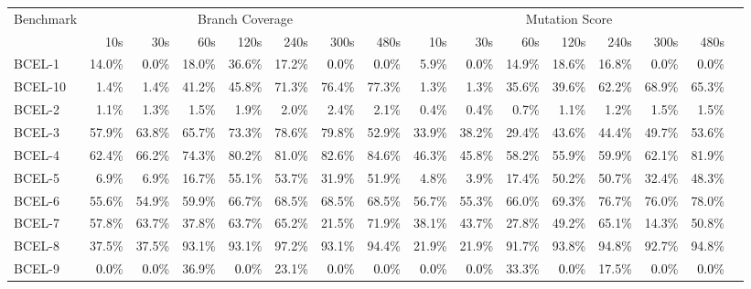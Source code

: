 \begin{tabular}{ l rrrrrrr rrrrrrrr}\toprule 
 Benchmark &  \multicolumn{7}{c}{Branch Coverage} &  \multicolumn{7}{c}{Mutation Score}\\ 
 & 10s & 30s & 60s & 120s & 240s & 300s & 480s & 10s & 30s & 60s & 120s & 240s & 300s & 480s \\ 
\midrule 
BCEL-1 & 14.0\% & \cellcolor{light-gray} \textcolor{black}{0.0}\% & 18.0\% & 36.6\% & 17.2\% & \cellcolor{light-gray} \textcolor{black}{0.0}\% & \cellcolor{light-gray} \textcolor{black}{0.0}\% & 5.9\% & \cellcolor{light-gray} \textcolor{black}{0.0}\% & 14.9\% & 18.6\% & 16.8\% & \cellcolor{light-gray} \textcolor{black}{0.0}\% & \cellcolor{light-gray} \textcolor{black}{0.0}\%\\ 
BCEL-10 & 1.4\% & 1.4\% & 41.2\% & 45.8\% & 71.3\% & 76.4\% & 77.3\% & 1.3\% & 1.3\% & 35.6\% & 39.6\% & 62.2\% & 68.9\% & 65.3\%\\ 
BCEL-2 & 1.1\% & 1.3\% & 1.5\% & 1.9\% & 2.0\% & 2.4\% & 2.1\% & 0.4\% & 0.4\% & 0.7\% & 1.1\% & 1.2\% & 1.5\% & 1.5\%\\ 
BCEL-3 & 57.9\% & 63.8\% & 65.7\% & 73.3\% & 78.6\% & 79.8\% & 52.9\% & 33.9\% & 38.2\% & 29.4\% & 43.6\% & 44.4\% & 49.7\% & 53.6\%\\ 
BCEL-4 & 62.4\% & 66.2\% & 74.3\% & 80.2\% & 81.0\% & 82.6\% & 84.6\% & 46.3\% & 45.8\% & 58.2\% & 55.9\% & 59.9\% & 62.1\% & 81.9\%\\ 
BCEL-5 & 6.9\% & 6.9\% & 16.7\% & 55.1\% & 53.7\% & 31.9\% & 51.9\% & 4.8\% & 3.9\% & 17.4\% & 50.2\% & 50.7\% & 32.4\% & 48.3\%\\ 
BCEL-6 & 55.6\% & 54.9\% & 59.9\% & 66.7\% & 68.5\% & 68.5\% & 68.5\% & 56.7\% & 55.3\% & 66.0\% & 69.3\% & 76.7\% & 76.0\% & 78.0\%\\ 
BCEL-7 & 57.8\% & 63.7\% & 37.8\% & 63.7\% & 65.2\% & 21.5\% & 71.9\% & 38.1\% & 43.7\% & 27.8\% & 49.2\% & 65.1\% & 14.3\% & 50.8\%\\ 
BCEL-8 & 37.5\% & 37.5\% & 93.1\% & 93.1\% & 97.2\% & 93.1\% & 94.4\% & 21.9\% & 21.9\% & 91.7\% & 93.8\% & 94.8\% & 92.7\% & 94.8\%\\ 
BCEL-9 & \cellcolor{light-gray} \textcolor{black}{0.0}\% & \cellcolor{light-gray} \textcolor{black}{0.0}\% & 36.9\% & \cellcolor{light-gray} \textcolor{black}{0.0}\% & 23.1\% & \cellcolor{light-gray} \textcolor{black}{0.0}\% & \cellcolor{light-gray} \textcolor{black}{0.0}\% & \cellcolor{light-gray} \textcolor{black}{0.0}\% & \cellcolor{light-gray} \textcolor{black}{0.0}\% & 33.3\% & \cellcolor{light-gray} \textcolor{black}{0.0}\% & 17.5\% & \cellcolor{light-gray} \textcolor{black}{0.0}\% & \cellcolor{light-gray} \textcolor{black}{0.0}\%\\ 

\end{tabular}

